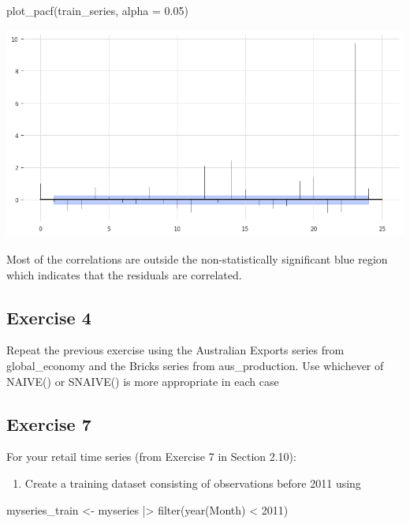 \documentclass[
  11pt,
]{article}
\newenvironment{Shaded}{\begin{snugshade}}{\end{snugshade}}
\newcommand{\FloatTok}[1]{\textcolor[rgb]{0.68,0.00,0.00}{#1}}
\newcommand{\NormalTok}[1]{\textcolor[rgb]{0.00,0.23,0.31}{#1}}
\newcommand{\OperatorTok}[1]{\textcolor[rgb]{0.37,0.37,0.37}{#1}}
\providecommand{\tightlist}{%
  \setlength{\itemsep}{0pt}\setlength{\parskip}{0pt}}\usepackage{longtable,booktabs,array}
\begin{document}
\begin{Shaded}
\begin{Highlighting}[]
\NormalTok{plot\_pacf(train\_series, alpha }\OperatorTok{=} \FloatTok{0.05}\NormalTok{)}
\end{Highlighting}
\end{Shaded}

\includegraphics{hw3_files/figure-pdf/cell-38-output-1.png}

Most of the correlations are outside the non-statistically significant
blue region which indicates that the residuals are correlated.

\subsection{Exercise 4}\label{exercise-4}

Repeat the previous exercise using the Australian Exports series from
global\_economy and the Bricks series from aus\_production. Use
whichever of NAIVE() or SNAIVE() is more appropriate in each case

\subsection{Exercise 7}\label{exercise-7}

For your retail time series (from Exercise 7 in Section 2.10):

\begin{enumerate}
\def\labelenumi{\alph{enumi}.}
\tightlist
\item
  Create a training dataset consisting of observations before 2011 using
\end{enumerate}

\begin{Shaded}
\begin{Highlighting}[]
\NormalTok{myseries\_train \textless{}{-} myseries |\textgreater{}}
\NormalTok{  filter(year(Month) \textless{} 2011)}
\end{Highlighting}
\end{Shaded}
\end{document}
